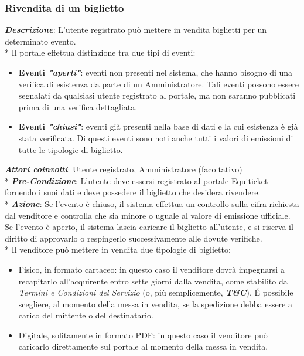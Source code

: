 \subsubsection{Rivendita di un biglietto}
\textbf{\textit{Descrizione}}: L'utente registrato può mettere in vendita biglietti per un determinato evento. \\* 
Il portale effettua distinzione tra due tipi di eventi: 
\begin{itemize}
\item \textbf{Eventi \textit{"aperti"}}: eventi non presenti nel sistema, che hanno bisogno di una verifica di esistenza da parte di un Amministratore. Tali eventi possono essere segnalati da qualsiasi utente registrato al portale, ma non saranno pubblicati prima di una verifica dettagliata. 
\item \textbf{Eventi \textit{"chiusi"}}: eventi già presenti nella base di dati e la cui esistenza è già stata verificata. Di questi eventi sono noti anche tutti i valori di emissioni di tutte le tipologie di biglietto.
\end{itemize}
\textbf{\textit{Attori coinvolti}}: Utente registrato, Amministratore (facoltativo) \\*
\textbf{\textit{Pre-Condizione}}: L'utente deve essersi registrato al portale Equiticket fornendo i suoi dati e deve possedere il biglietto che desidera rivendere. \\*
\textbf{\textit{Azione}}: Se l'evento è chiuso, il sistema effettua un controllo sulla cifra richiesta dal venditore e controlla che sia minore o uguale al valore di emissione ufficiale. Se l'evento è aperto, il sistema lascia caricare il biglietto all'utente, e si riserva il diritto di approvarlo o respingerlo successivamente alle dovute verifiche. \\*
Il venditore può mettere in vendita due tipologie di biglietto: 
\begin{itemize}
\item Fisico, in formato cartaceo: in questo caso il venditore dovrà impegnarsi a recapitarlo all'acquirente entro sette giorni dalla vendita, come stabilito da \textit{Termini e Condizioni del Servizio} (o, più semplicemente, \textbf{\textit{T\&C}}). \'E possibile scegliere, al momento della messa in vendita, se la spedizione debba essere a carico del mittente o del destinatario.
\item Digitale, solitamente in formato PDF: in questo caso il venditore può caricarlo direttamente sul portale al momento della messa in vendita.
\end{itemize}
